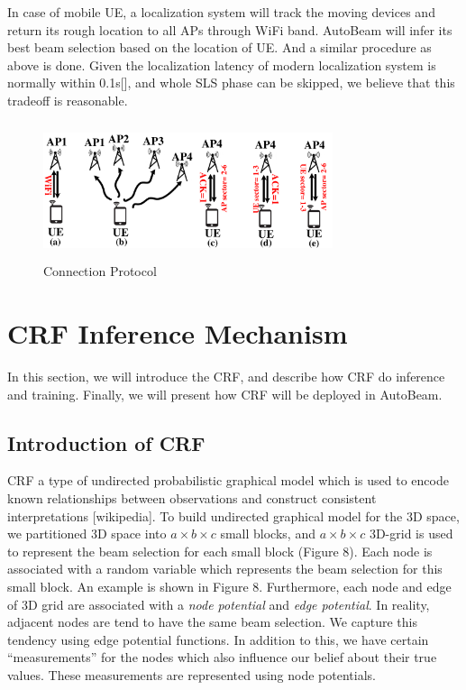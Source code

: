 \documentclass[conference]{IEEEtran}
\begin{document}
In case of mobile UE, a localization system will track the moving devices and return its rough location to all APs through WiFi band. AutoBeam will infer its best beam selection based on the location of UE. And a similar procedure as above is done. 
Given the localization latency of modern localization system is normally within 0.1s[], and whole SLS phase can be skipped, we believe that this tradeoff is reasonable. 
\begin{figure}
	\centerline{\includegraphics[width=8.5cm,height=4cm]{connection_protocol}}
	\caption[U-example]{Connection Protocol}
\end{figure}

\section{CRF Inference Mechanism}
In this section, we will introduce the CRF, and describe how CRF do inference and training. Finally, we will present how CRF will be deployed in AutoBeam.
\subsection{Introduction of CRF}
CRF a type of undirected probabilistic graphical model which is used to encode known relationships between observations and construct consistent interpretations [wikipedia]. To build undirected graphical model for the 3D space, we partitioned 3D space into $a\times b\times c$ small blocks, and $a\times b\times c$ 3D-grid is used to represent the beam selection for each small block (Figure 8). Each node is associated with a random variable which represents the beam selection for this small block. An example is shown in Figure 8. Furthermore, each node and edge of 3D grid are associated with a \emph{node potential} and \emph{edge potential}. In reality, adjacent nodes are tend to have the same beam selection. We capture this tendency using edge potential functions. In addition to this, we have certain “measurements” for the nodes which also influence our belief about their true values. These measurements are represented using node potentials.
\end{document}
